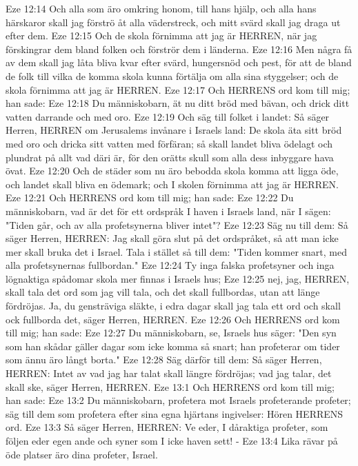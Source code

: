 Eze 12:14  Och alla som äro omkring honom, till hans hjälp, och alla hans härskaror skall jag förströ åt alla väderstreck, och mitt svärd skall jag draga ut efter dem.
Eze 12:15  Och de skola förnimma att jag är HERREN, när jag förskingrar dem bland folken och förströr dem i länderna.
Eze 12:16  Men några få av dem skall jag låta bliva kvar efter svärd, hungersnöd och pest, för att de bland de folk till vilka de komma skola kunna förtälja om alla sina styggelser; och de skola förnimma att jag är HERREN.
Eze 12:17  Och HERRENS ord kom till mig; han sade:
Eze 12:18  Du människobarn, ät nu ditt bröd med bävan, och drick ditt vatten darrande och med oro.
Eze 12:19  Och säg till folket i landet: Så säger Herren, HERREN om Jerusalems invånare i Israels land: De skola äta sitt bröd med oro och dricka sitt vatten med förfäran; så skall landet bliva ödelagt och plundrat på allt vad däri är, för den orätts skull som alla dess inbyggare hava övat.
Eze 12:20  Och de städer som nu äro bebodda skola komma att ligga öde, och landet skall bliva en ödemark; och I skolen förnimma att jag är HERREN.
Eze 12:21  Och HERRENS ord kom till mig; han sade:
Eze 12:22  Du människobarn, vad är det för ett ordspråk I haven i Israels land, när I sägen: "Tiden går, och av alla profetsynerna bliver intet"?
Eze 12:23  Säg nu till dem: Så säger Herren, HERREN: Jag skall göra slut på det ordspråket, så att man icke mer skall bruka det i Israel. Tala i stället så till dem: "Tiden kommer snart, med alla profetsynernas fullbordan."
Eze 12:24  Ty inga falska profetsyner och inga lögnaktiga spådomar skola mer finnas i Israels hus;
Eze 12:25  nej, jag, HERREN, skall tala det ord som jag vill tala, och det skall fullbordas, utan att länge fördröjas. Ja, du gensträviga släkte, i edra dagar skall jag tala ett ord och skall ock fullborda det, säger Herren, HERREN.
Eze 12:26  Och HERRENS ord kom till mig; han sade:
Eze 12:27  Du människobarn, se, Israels hus säger: "Den syn som han skådar gäller dagar som icke komma så snart; han profeterar om tider som ännu äro långt borta."
Eze 12:28  Säg därför till dem: Så säger Herren, HERREN: Intet av vad jag har talat skall längre fördröjas; vad jag talar, det skall ske, säger Herren, HERREN.
Eze 13:1  Och HERRENS ord kom till mig; han sade:
Eze 13:2  Du människobarn, profetera mot Israels profeterande profeter; säg till dem som profetera efter sina egna hjärtans ingivelser: Hören HERRENS ord.
Eze 13:3  Så säger Herren, HERREN: Ve eder, I dåraktiga profeter, som följen eder egen ande och syner som I icke haven sett! -
Eze 13:4  Lika rävar på öde platser äro dina profeter, Israel.
